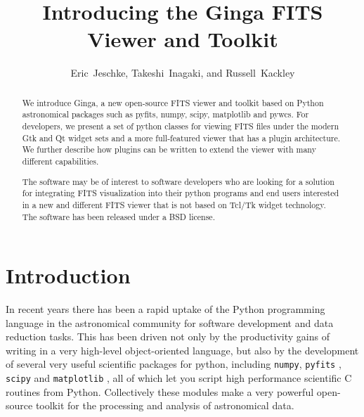 
\resetcounters




\title{Introducing the Ginga FITS Viewer and Toolkit}
\author{Eric~Jeschke, Takeshi~Inagaki, and Russell~Kackley
}


\begin{abstract}
We introduce Ginga, a new open-source FITS
viewer and toolkit based on Python astronomical packages such as pyfits,
numpy, scipy, matplotlib and pywcs.  For developers, we present a set of
python classes for viewing FITS files under the modern Gtk and Qt widget
sets and a more  full-featured viewer that has a plugin architecture.
We further describe how plugins can be written to extend the viewer with
many different capabilities.  

The software may be of interest to software developers who are
looking for a solution for integrating FITS visualization into their
python programs and end users interested in a new and different FITS
viewer that is not based on Tcl/Tk widget technology.  The software has
been released under a BSD license.
\end{abstract}

\section{Introduction}
In recent years there has been a rapid uptake of the Python
programming language in the astronomical community for software
development and data reduction tasks.
This has been driven not only by the productivity gains of writing in a
very high-level object-oriented language, but also by the development of
several very useful scientific packages for python, including 
{\tt numpy}, {\tt pyfits} \citep{Barrett99}, {\tt scipy} and 
{\tt matplotlib} \citep{matplotlib}, all of which let you script high
performance scientific C routines from Python. 
Collectively these modules make a very powerful open-source toolkit for the
processing and analysis of astronomical data.

